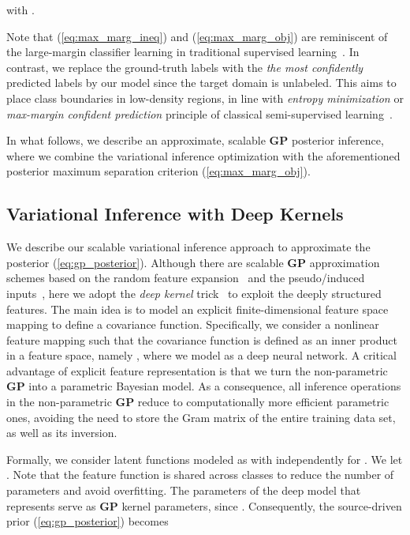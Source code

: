 \documentclass[10pt,letterpaper]{article}
\begin{document}
with .


Note that (\ref{eq:max_marg_ineq}) and (\ref{eq:max_marg_obj}) are reminiscent of the large-margin classifier learning in traditional supervised learning~\cite{vapnik_book98}. In contrast, we replace the ground-truth labels with the {\em the most confidently} predicted labels by our model since the target domain is unlabeled. This aims to place class boundaries in low-density regions, in line with {\em entropy minimization} or {\em max-margin confident prediction} principle of classical semi-supervised learning~\cite{ssem04,semisup_book}.

In what follows, we describe an approximate, scalable \textbf {GP} posterior inference, where we combine the variational inference optimization with the aforementioned posterior maximum separation criterion (\ref{eq:max_marg_obj}).


\subsection{Variational Inference with Deep Kernels}\label{sec:vi}

We describe our scalable variational inference approach to approximate the posterior (\ref{eq:gp_posterior}). Although there are scalable \textbf {GP} approximation schemes based on the random feature expansion~\cite{rf_fourier} and the pseudo/induced inputs~\cite{quinonero05,snelson06,titsias09,dezfouli15}, here we adopt the {\em deep kernel} trick~\cite{deep_kernel,dkl16} to exploit the deeply structured features. The main idea is to model an explicit finite-dimensional feature space mapping to define a covariance function. Specifically, we consider a nonlinear feature mapping  such that the covariance function is defined as an inner product in a feature space, namely , where we model  as a deep neural network.
A critical advantage of explicit feature representation is that we turn the non-parametric \textbf {GP} into a parametric Bayesian model. 
As a consequence, all inference operations in the non-parametric \textbf {GP} reduce to computationally more efficient parametric ones, avoiding the need to store the Gram matrix of the entire training data set, as well as its inversion. 

Formally, we consider  latent functions modeled as  with  independently for . We let . Note that the feature function  is shared across classes to reduce the number of parameters and avoid overfitting.
The parameters of the deep model that represents  serve as \textbf {GP} kernel parameters, since . 
Consequently, the source-driven  prior (\ref{eq:gp_posterior}) becomes
\end{document}
